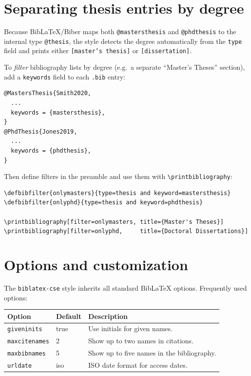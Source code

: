 \documentclass[11pt]{article}
\begin{document}
\section{Separating thesis entries by degree}

Because Bib\LaTeX{}/Biber maps both \texttt{@mastersthesis} and \texttt{@phdthesis} to the
internal type \texttt{@thesis}, the style detects the degree automatically from the
\texttt{type} field and prints either \texttt{[master's thesis]} or \texttt{[dissertation]}.

To \emph{filter} bibliography lists by degree (e.g.\ a separate ``Master's Theses''
section), add a \texttt{keywords} field to each \texttt{.bib} entry:

\begin{verbatim}
@MastersThesis{Smith2020,
  ...
  keywords = {mastersthesis},
}
@PhdThesis{Jones2019,
  ...
  keywords = {phdthesis},
}
\end{verbatim}

Then define filters in the preamble and use them with \verb|\printbibliography|:

\begin{verbatim}
\defbibfilter{onlymasters}{type=thesis and keyword=mastersthesis}
\defbibfilter{onlyphd}{type=thesis and keyword=phdthesis}

\printbibliography[filter=onlymasters, title={Master's Theses}]
\printbibliography[filter=onlyphd,     title={Doctoral Dissertations}]
\end{verbatim}

\section{Options and customization}

The \texttt{biblatex-cse} style inherits all standard Bib\LaTeX{} options.  
Frequently used options:

\begin{center}
\begin{tabular}{@{}lll@{}}
\textbf{Option} & \textbf{Default} & \textbf{Description} \\
\hline
\texttt{giveninits} & true & Use initials for given names. \\
\texttt{maxcitenames} & 2 & Show up to two names in citations. \\
\texttt{maxbibnames} & 5 & Show up to five names in the bibliography. \\
\texttt{urldate} & iso & ISO date format for access dates. \\
\end{tabular}
\end{center}
\end{document}
